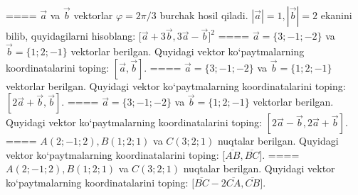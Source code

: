 ====
$\vec{a}$ va $\vec{b}$ vektorlar $\varphi = 2\pi/3$ burchak hosil qiladi. $|\vec{a}| = 1,|\vec{b}| = 2$ ekanini bilib, quyidagilarni hisoblang:
$\lbrack\overrightarrow{a} + 3\overrightarrow{b},3\overrightarrow{a} - \overrightarrow{b}\rbrack^{2}$
====
$\vec{a} = \{ 3; - 1; - 2\}$ va $\vec{b} = \{ 1;2; - 1\}$ vektorlar berilgan. Quyidagi vektor ko‘paytmalarning koordinatalarini toping:
$\left\lbrack \vec{a},\vec{b} \right\rbrack$.
====
$\vec{a} = \{ 3; - 1; - 2\}$ va $\vec{b} = \{ 1;2; - 1\}$ vektorlar berilgan. Quyidagi vektor ko‘paytmalarning koordinatalarini toping:
$\left\lbrack 2\vec{a} + \vec{b},\vec{b} \right\rbrack$.
====
$\vec{a} = \{ 3; - 1; - 2\}$ va $\vec{b} = \{ 1;2; - 1\}$ vektorlar berilgan. Quyidagi vektor ko‘paytmalarning koordinatalarini toping:
$\left\lbrack 2\vec{a} - \vec{b},2\vec{a} + \vec{b} \right\rbrack$.
====
$A (2; -1;2),B (1;2; 1) $ va $C (3;2;1)$ nuqtalar berilgan. Quyidagi vektor ko‘paytmalarning koordinatalarini toping:
$\lbrack\overline{AB},\overline{BC}\rbrack$.
====
$A (2; -1;2),B (1;2; 1) $ va $C (3;2;1) $ nuqtalar berilgan. Quyidagi vektor ko‘paytmalarning koordinatalarini toping:
$\lbrack\overline{BC} - 2\overline{CA},\overline{CB}\rbrack$. 